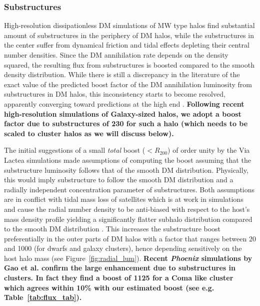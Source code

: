 \documentclass[10pt,aps,pra,reprint,amsmath,amsfonts,amssymb,showpacs,nofootinbib,floatfix]{revtex4-1}
\def\C#1{{\bf #1}}
\begin{document}
\subsubsection{Substructures}
\label{sect:subst}
High-resolution dissipationless DM simulations of MW type halos find
substantial amount of substructures in the periphery of DM halos,
while the substructures in the center suffer from dynamical friction
and tidal effects depleting their central number densities. Since the
DM annihilation rate depends on the density squared, the resulting
flux from substructures is boosted compared to the smooth density
distribution. While there is still a discrepancy in the literature of
the exact value of the predicted boost factor of the DM annihilation
luminosity from substructures in DM halos, this inconsistency starts
to become resolved, apparently converging toward predictions at the
high end \protect \cite{2008MNRAS.391.1685S, 2008Natur.456...73S,
  2010ApJ...718..899A}. \C{Following recent high-resolution
  simulations of Galaxy-sized halos, we adopt a boost factor due to
  substructures of 230 for such a halo \cite{2008MNRAS.391.1685S}
  (which needs to be scaled to cluster halos as we will discuss
  below).}

The initial suggestions of a small {\em total} boost ($<R_{200}$) of
order unity by the Via Lactea simulations \cite{2008JPhCS.125a2008K}
made assumptions of computing the boost assuming that the substructure
luminosity follows that of the smooth DM distribution. Physically,
this would imply substructure to follow the smooth DM distribution and
a radially independent concentration parameter of substructures. Both
assumptions are in conflict with tidal mass loss of satellites which
is at work in simulations and cause the radial number density to be
anti-biased with respect to the host's mass density profile yielding a
significantly flatter subhalo distribution compared to the smooth DM
distribution \cite{2010ApJ...718..899A}. This increases the
substructure boost preferentially in the outer parts of DM halos with
a factor that ranges between 20 and 1000 (for dwarfs and galaxy
clusters), hence depending sensitively on the host halo mass (see
Figure~\ref{fig:radial_lum}). \C{Recent {\it Phoenix} simulations by
  Gao et al. \cite{2011arXiv1107.1916G} confirm the large enhancement
  due to substructures in clusters. In fact they find a boost of 1125
  for a Coma like cluster which agrees within 10\% with our estimated
  boost (see e.g. Table~\ref{tab:flux_tab}).}
\end{document}
